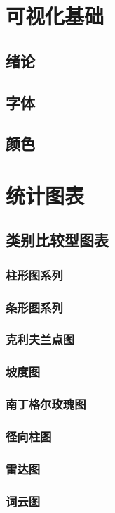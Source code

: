 \documentclass[openany]{progbookcn}
\begin{document}
\chapter{可视化基础}
\section{绪论}
\section{字体}
\section{颜色}

\chapter{统计图表}
\section{类别比较型图表}
\subsection{柱形图系列}
\subsection{条形图系列}
\subsection{克利夫兰点图}
\subsection{坡度图}
\subsection{南丁格尔玫瑰图}
\subsection{径向柱图}
\subsection{雷达图}
\subsection{词云图}
\end{document}
